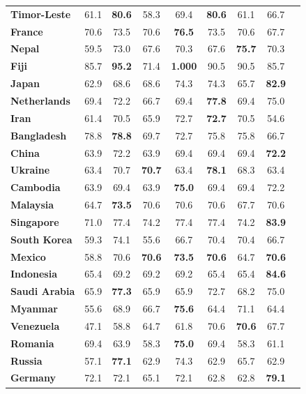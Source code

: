 \begin{table}
{\begin{tabular}{lcccccccc}
\textbf{Timor-Leste} & 61.1 & \textbf{80.6} & 58.3 & 69.4 & \textbf{80.6} & 61.1 & 66.7 \\
\textbf{France} & 70.6 & 73.5 & 70.6 & \textbf{76.5} & 73.5 & 70.6 & 67.7 \\
\textbf{Nepal} & 59.5 & 73.0 & 67.6 & 70.3 & 67.6 & \textbf{75.7} & 70.3 \\
\textbf{Fiji} & 85.7 & \textbf{95.2} & 71.4 & \textbf{1.000} & 90.5 & 90.5 & 85.7 \\
\textbf{Japan} & 62.9 & 68.6 & 68.6 & 74.3 & 74.3 & 65.7 & \textbf{82.9} \\
\textbf{Netherlands} & 69.4 & 72.2 & 66.7 & 69.4 & \textbf{77.8} & 69.4 & 75.0 \\
\textbf{Iran} & 61.4 & 70.5 & 65.9 & 72.7 & \textbf{72.7} & 70.5 & 54.6 \\
\textbf{Bangladesh} & 78.8 & \textbf{78.8} & 69.7 & 72.7 & 75.8 & 75.8 & 66.7 \\
\textbf{China} & 63.9 & 72.2 & 63.9 & 69.4 & 69.4 & 69.4 & \textbf{72.2} \\
\textbf{Ukraine} & 63.4 & 70.7 & \textbf{70.7} & 63.4 & \textbf{78.1} & 68.3 & 63.4 \\
\textbf{Cambodia} & 63.9 & 69.4 & 63.9 & \textbf{75.0} & 69.4 & 69.4 & 72.2 \\
\textbf{Malaysia} & 64.7 & \textbf{73.5} & 70.6 & 70.6 & 70.6 & 67.7 & 70.6 \\
\textbf{Singapore} & 71.0 & 77.4 & 74.2 & 77.4 & 77.4 & 74.2 & \textbf{83.9} \\
\textbf{South Korea} & 59.3 & 74.1 & 55.6 & 66.7 & 70.4 & 70.4 & 66.7 \\
\textbf{Mexico} & 58.8 & 70.6 & \textbf{70.6} & \textbf{73.5} & \textbf{70.6} & 64.7 & \textbf{70.6} \\
\textbf{Indonesia} & 65.4 & 69.2 & 69.2 & 69.2 & 65.4 & 65.4 & \textbf{84.6} \\
\textbf{Saudi Arabia} & 65.9 & \textbf{77.3} & 65.9 & 65.9 & 72.7 & 68.2 & 75.0 \\
\textbf{Myanmar} & 55.6 & 68.9 & 66.7 & \textbf{75.6} & 64.4 & 71.1 & 64.4 \\
\textbf{Venezuela} & 47.1 & 58.8 & 64.7 & 61.8 & 70.6 & \textbf{70.6} & 67.7 \\
\textbf{Romania} & 69.4 & 63.9 & 58.3 & \textbf{75.0} & 69.4 & 58.3 & 61.1 \\
\textbf{Russia} & 57.1 & \textbf{77.1} & 62.9 & 74.3 & 62.9 & 65.7 & 62.9 \\
\textbf{Germany} & 72.1 & 72.1 & 65.1 & 72.1 & 62.8 & 62.8 & \textbf{79.1} \\

\end{tabular}}
\end{table}
